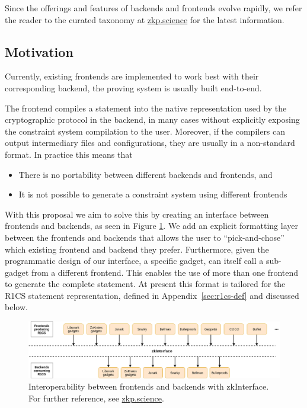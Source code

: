 \documentclass[a4paper,12pt]{article}
\begin{document}
Since the offerings and features of backends and frontends evolve rapidly, we refer the reader to the curated taxonomy at \href{https://zkp.science}{zkp.science} for the latest information.  

 

\subsection{Motivation}

Currently, existing frontends are implemented to work best with their corresponding backend, the proving system is usually built end-to-end.

The frontend compiles a statement into the native representation used by the cryptographic protocol in the backend, in many cases without explicitly exposing the constraint system compilation to the user. Moreover, if the compilers can output intermediary files and configurations, they are usually in a non-standard format. In practice this means that
\begin{itemize}
	\item There is no portability between different backends and frontends, and
	\item It is not possible to generate a constraint system using different frontends
\end{itemize}   

With this proposal we aim to solve this by creating an interface between frontends and backends, as seen in Figure \ref{interface}. We add an explicit formatting layer between the frontends and backends that allows the user to ``pick-and-chose'' which existing frontend and backend they prefer. Furthermore, given the programmatic design of our interface, a specific gadget, can itself call a sub-gadget from a different frontend. This enables the use of more than one frontend to generate the complete statement. At present this format is tailored for the R1CS statement representation, defined in Appendix~\ref{sec:r1cs-def} and discussed below.

\begin{figure}[h!]
	\includegraphics[width=\linewidth]{graphics/interop.png}
	\caption{Interoperability between frontends and backends with zkInterface. For further reference, see \href{https://zkp.science}{zkp.science}.}
	\label{interface}
\end{figure}
\end{document}
